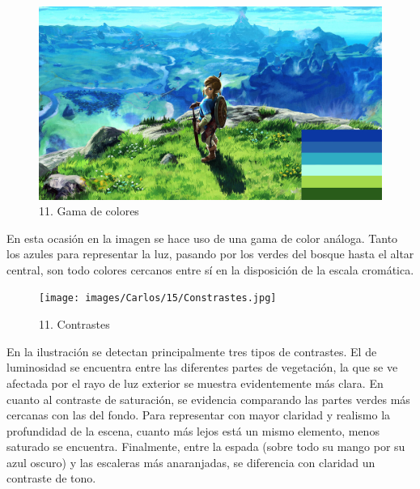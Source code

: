 \documentclass[12pt]{article}
\begin{document}
      \begin{figure}[H]
      \centering
      \includegraphics[scale=0.35]{images/Carlos/15/Gamma.jpg}
      \caption{\small 11. Gama de colores}
      \end{figure}
      En esta ocasión en la imagen se hace uso de una gama de color análoga. Tanto los azules para representar la luz, pasando por los verdes del bosque hasta el altar central, son todo colores cercanos entre sí en la disposición de la escala cromática.

      \begin{figure}[H]
      \centering
      \texttt{[image: images/Carlos/15/Constrastes.jpg]}
      \caption{\small 11. Contrastes}
      \end{figure}
      En la ilustración se detectan principalmente tres tipos de contrastes. El de luminosidad se encuentra entre las diferentes partes de vegetación, la que se ve afectada por el rayo de luz exterior se muestra evidentemente más clara. En cuanto al contraste de saturación, se evidencia comparando las partes verdes más cercanas con las del fondo. Para representar con mayor claridad y realismo la profundidad de la escena, cuanto más lejos está un mismo elemento, menos saturado se encuentra. Finalmente, entre la espada (sobre todo su mango por su azul oscuro) y las escaleras más anaranjadas, se diferencia con claridad un contraste de tono.
\end{document}
